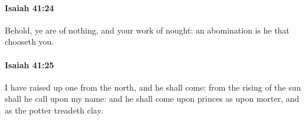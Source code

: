		\paragraph{Isaiah 41:24} %
			\label{ISAIAH-41-24}

			Behold, ye are of nothing, and your work of nought: an abomination is he that chooseth you.


		\paragraph{Isaiah 41:25} %
			\label{ISAIAH-41-25}

			I have raised up one from the north, and he shall come: from the rising of the sun shall he call upon my name: and he shall come upon princes as upon morter, and as the potter treadeth clay.


